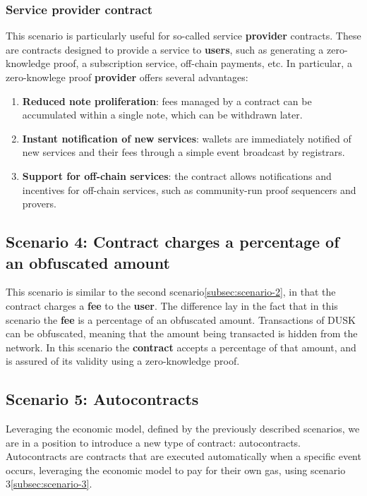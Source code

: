 \documentclass[twocolumn, nofootinbib]{revtex4-2} %
\newcommand{\dusk}{{\footnotesize\textsf{DUSK}}\xspace}
\newcommand{\emphasize}[1]{\textbf{#1}\xspace}
\newcommand{\contract}{\emphasize{contract}}
\newcommand{\fee}{\emphasize{fee}}
\newcommand{\provider}{\emphasize{provider}}
\newcommand{\user}{\emphasize{user}}
\newcommand{\users}{\emphasize{users}}
\begin{document}
    \subsubsection*{Service provider contract}\label{subsubsec:scenario-3-service-provider-contract}
    This scenario is particularly useful for so-called service \provider contracts.
    These are contracts designed to provide a service to \users, such as
    generating a zero-knowledge proof, a subscription service, off-chain
    payments, etc.
    In particular, a zero-knowlege proof \provider offers several advantages:

    \begin{enumerate}
        \item \textbf{Reduced note proliferation}: fees managed by a contract
        can be accumulated within a single note, which can be withdrawn
        later.
        \item \textbf{Instant notification of new services}: wallets are
        immediately notified of new services and their fees through a
        simple event broadcast by registrars.
        \item \textbf{Support for off-chain services}: the contract allows
        notifications and incentives for off-chain services, such as
        community-run proof sequencers and provers.
    \end{enumerate}

    \subsection*{Scenario 4: Contract charges a percentage of an obfuscated amount}\label{subsec:scenario-4}
    This scenario is similar to the second scenario\ref{subsec:scenario-2}, in
    that the contract charges a \fee to the \user.
    The difference lay in the fact that in this scenario the \fee is a
    percentage of an obfuscated amount.
    Transactions of \dusk can be obfuscated, meaning that the amount being
    transacted is hidden from the network.
    In this scenario the \contract accepts a percentage of that amount, and
    is assured of its validity using a zero-knowledge proof.

    \subsection*{Scenario 5: Autocontracts}\label{subsec:scenario-5}

    Leveraging the economic model, defined by the previously described scenarios,
    we are in a position to introduce a new type of contract: autocontracts.
    Autocontracts are contracts that are executed automatically when a specific
    event occurs, leveraging the economic model to pay for their own gas, using
    scenario 3\ref{subsec:scenario-3}.
\end{document}
